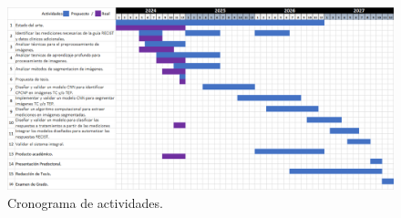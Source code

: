 \documentclass[11pt,a4paper,openany]{article}
\begin{document}

    \begin{figure}[H]
        \centering
        \includegraphics[width=15 cm]{cronograma.png}
        \caption {Cronograma de actividades.\label{fig:Cronograma}}
    \end{figure}

\end{document}
